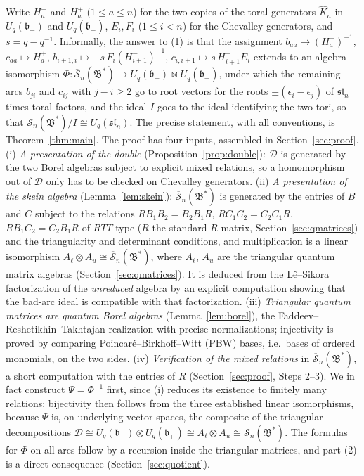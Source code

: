 \documentclass[11pt]{article}
\theoremstyle{remark}
\newcommand{\U}{U_q}
\newcommand{\slN}{\mathfrak{sl}_n}
\newcommand{\bp}{\mathfrak b_+}
\newcommand{\bm}{\mathfrak b_-}
\newcommand{\redS}{\overline{\mathcal S}_n}
\newcommand{\Bstar}{\mathfrak B^*}
\newcommand{\ot}{\otimes}
\newcommand{\cD}{\mathcal D}
\begin{document}
Write $H^-_a$ and $H^+_a$ ($1\le a\le n$) for the two copies of the
toral generators $\hat K_a$ in $\U(\bm)$ and $\U(\bp)$, $E_i,F_i$
($1\le i<n$) for the Chevalley generators, and $s=q-q^{-1}$.
Informally, the answer to (1) is that the assignment
$b_{aa}\mapsto(H^-_a)^{-1}$, $c_{aa}\mapsto H^+_a$,
$b_{i+1,i}\mapsto -s\,F_i(H^-_{i+1})^{-1}$,
$c_{i,i+1}\mapsto s\,H^+_{i+1}E_i$
extends to an algebra isomorphism
$\Phi:\redS(\Bstar)\to\U(\bm)\bowtie\U(\bp)$, under which the remaining
arcs $b_{ji}$ and $c_{ij}$ with $j-i\ge2$ go to root vectors for the
roots $\pm(\epsilon_i-\epsilon_j)$ of $\slN$ times toral factors, and
the ideal $I$ goes to the ideal identifying the two tori, so that
$\redS(\Bstar)/I\cong\U(\slN)$. The precise statement, with all
conventions, is Theorem~\ref{thm:main}.
The proof has four inputs, assembled in Section~\ref{sec:proof}.
(i) \emph{A presentation of the double} (Proposition~\ref{prop:double}):
$\cD$ is generated by the two Borel algebras subject to explicit mixed
relations, so a homomorphism out of $\cD$ only has to be checked on
Chevalley generators.
(ii) \emph{A presentation of the skein algebra} (Lemma~\ref{lem:skein}):
$\redS(\Bstar)$ is generated by the entries of $B$ and $C$ subject to
the relations $RB_1B_2=B_2B_1R$, $RC_1C_2=C_2C_1R$, $RB_1C_2=C_2B_1R$
of $RTT$ type ($R$ the standard $R$-matrix, Section~\ref{sec:qmatrices})
and the triangularity and determinant conditions, and multiplication is a
linear isomorphism $A_\ell\ot A_u\cong\redS(\Bstar)$, where $A_\ell$,
$A_u$ are the triangular quantum matrix algebras
(Section~\ref{sec:qmatrices}). It is deduced from the L\^e--Sikora
factorization \cite{LS} of the \emph{unreduced} algebra by an explicit
computation showing that the bad-arc ideal is compatible with that
factorization.
(iii) \emph{Triangular quantum matrices are quantum Borel algebras}
(Lemma~\ref{lem:borel}), the Faddeev--Reshetikhin--Takhtajan realization
\cite{FRT} with precise normalizations; injectivity is proved by
comparing Poincar\'e--Birkhoff--Witt (PBW) bases, i.e.\ bases of
ordered monomials, on the two sides.
(iv) \emph{Verification of the mixed relations} in $\redS(\Bstar)$, a
short computation with the entries of $R$ (Section~\ref{sec:proof},
Steps 2--3).
We in fact construct $\Psi=\Phi^{-1}$ first, since (i) reduces its
existence to finitely many relations; bijectivity then follows from
the three established linear isomorphisms, because $\Psi$ is, on
underlying vector spaces, the composite of the triangular
decompositions $\cD\cong\U(\bm)\ot\U(\bp)\cong
A_\ell\ot A_u\cong\redS(\Bstar)$. The formulas for $\Phi$ on all arcs
follow by a recursion inside the triangular matrices, and part (2) is a
direct consequence (Section~\ref{sec:quotient}).
\end{document}
